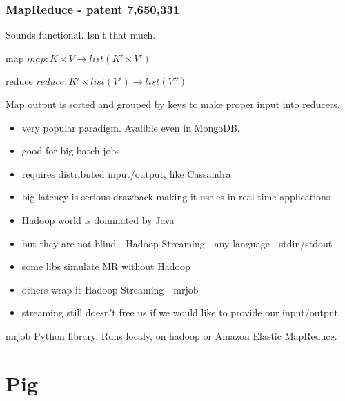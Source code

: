 \documentclass{beamer}
\begin{document}
\begin{frame}
    \frametitle{MapReduce - patent 7,650,331}
    Sounds functional. \pause Isn't that much.
    \begin{block}{map}
        $ map: K \times V \rightarrow list (K' \times V') $
    \end{block}
    \begin{block}{reduce}
        $ reduce: K' \times list(V') \rightarrow list (V'')$
    \end{block}

    Map output is sorted and grouped by keys to make proper input into reducers.

    \begin{itemize}
        \item very popular paradigm. Avalible even in MongoDB.
        \item good for big batch jobs
        \item requires distributed input/output, like Cassandra
        \item big latency is serious drawback making it useles in real-time applications
    \end{itemize}

\end{frame}



\begin{frame}
    \begin{itemize}
        \item Hadoop world is dominated by Java
            \pause
        \item but they are not blind - Hadoop Streaming - any language - stdin/stdout
        \item some libs simulate MR without Hadoop
        \item others wrap it Hadoop Streaming - mrjob
        \item streaming still doesn't free us if we would like to provide our input/output
    \end{itemize}
    \begin{block}{mrjob}
    Python library. Runs localy, on hadoop or Amazon Elastic MapReduce.
    \end{block}
\end{frame}


\begin{frame}
    
\end{frame}


\section{Pig}
\end{document}
